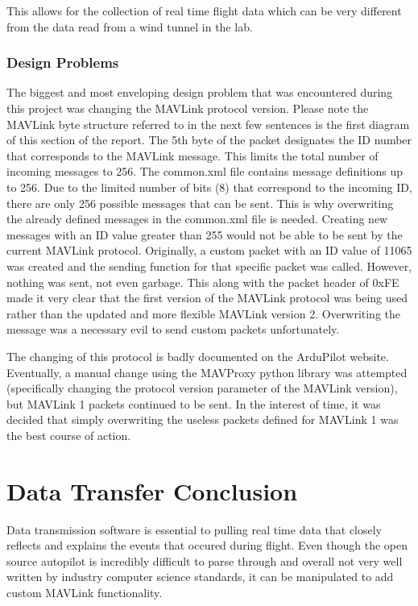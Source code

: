 \documentclass[12pt,journal,compsoc]{IEEEtran}
\begin{document}
This allows for the collection of real time flight data which can be very different from the data read from a wind tunnel in the lab. 

\subsubsection{Design Problems}
The biggest and most enveloping design problem that was encountered during this project was changing the MAVLink protocol version. Please note the MAVLink byte structure referred to in the next few sentences is the first diagram of this section of the report. The 5th byte of the packet designates the ID number that corresponds to the MAVLink message. This limits the total number of incoming messages to 256. The common.xml file contains message definitions up to 256. Due to the limited number of bits (8) that correspond to the incoming ID, there are only 256 possible messages that can be sent. This is why overwriting the already defined messages in the common.xml file is needed. Creating new messages with an ID value greater than 255 would not be able to be sent by the current MAVLink protocol. Originally, a custom packet with an ID value of 11065 was created and the sending function for that specific packet was called. However, nothing was sent, not even garbage. This along with the packet header of 0xFE made it very clear that the first version of the MAVLink protocol was being used rather than the updated and more flexible MAVLink version 2. Overwriting the message was a necessary evil to send custom packets unfortunately. 

The changing of this protocol is badly documented on the ArduPilot website. Eventually, a manual change using the MAVProxy python library was attempted (specifically changing the protocol version parameter of the MAVLink version), but MAVLink 1 packets continued to be sent. In the interest of time, it was decided that simply overwriting the useless packets defined for MAVLink 1 was the best course of action.

\section{Data Transfer Conclusion}
Data transmission software is essential to pulling real time data that closely reflects and explains the events that occured during flight. Even though the open source autopilot is incredibly difficult to parse through and overall not very well written by industry computer science standards, it can be manipulated to add custom MAVLink functionality. 
\end{document}
